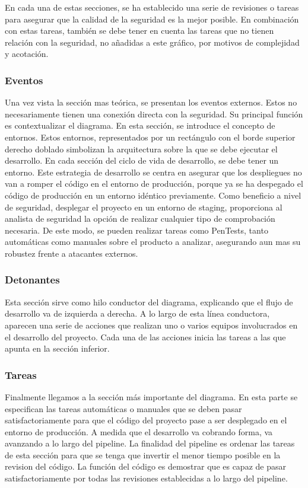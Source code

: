 \documentclass[12pt]{report} %
\begin{document}
En cada una de estas secciones, se ha establecido una serie de revisiones o
tareas para asegurar que la calidad de la seguridad es la mejor posible.
En combinación con estas tareas, también se debe tener en cuenta las tareas que
no tienen relación con la seguridad, no añadidas a este gráfico, por motivos de
complejidad y acotación.

\subsubsection{Eventos}

Una vez vista la sección mas teórica, se presentan los eventos externos. 
Estos no necesariamente tienen una conexión directa con la seguridad.
Su principal función es contextualizar el diagrama.
En esta sección, se introduce el concepto de entornos.
Estos entornos, representados por un rectángulo con el borde superior derecho
doblado simbolizan la arquitectura sobre la que se debe ejecutar el desarrollo.
En cada sección del ciclo de vida de desarrollo, se debe tener un entorno.
Este estrategia de desarrollo se centra en asegurar que los despliegues no van a
romper el código en el entorno de producción, porque ya se ha despegado el
código de producción en un entorno idéntico previamente.
Como beneficio a nivel de seguridad, desplegar el proyecto en un entorno de
staging, proporciona al analista de seguridad la opción de realizar cualquier
tipo de comprobación necesaria. 
De este modo, se pueden realizar tareas como \gls{PenTest}s, tanto automáticas
como manuales sobre el producto a analizar, asegurando aun mas su robustez frente
a atacantes externos.

\subsubsection{Detonantes}
 
Esta sección sirve como hilo conductor del diagrama, explicando que el flujo de
desarrollo va de izquierda a derecha.
A lo largo de esta línea conductora, aparecen una serie de acciones que realizan
uno o varios equipos involucrados en el desarrollo del proyecto.
Cada una de las acciones inicia las tareas a las que apunta en la sección
inferior.

\subsubsection{Tareas}

Finalmente llegamos a la sección más importante del diagrama.
En esta parte se especifican las tareas automáticas o manuales que se deben
pasar satisfactoriamente para que el código del proyecto pase a ser desplegado
en el entorno de producción.
A medida que el desarrollo va cobrando forma, va avanzando a lo largo del
\gls{pipeline}.
La finalidad del pipeline es ordenar las tareas de esta sección para que se tenga
que invertir el menor tiempo posible en la revision del código.
La función del código es demostrar que es capaz de pasar satisfactoriamente por
todas las revisiones establecidas a lo largo del \gls{pipeline}.
 
\end{document}
